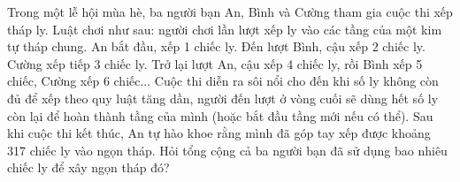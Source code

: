  \begin{ex}%
     Trong một lễ hội mùa hè, ba người bạn An, Bình và Cường tham gia cuộc thi xếp tháp ly. Luật chơi như sau: người chơi lần lượt xếp ly vào các tầng của một kim tự tháp chung. An bắt đầu, xếp 1 chiếc ly. Đến lượt Bình, cậu xếp 2 chiếc ly. Cường xếp tiếp 3 chiếc ly. Trở lại lượt An, cậu xếp 4 chiếc ly, rồi Bình xếp 5 chiếc, Cường xếp 6 chiếc... Cuộc thi diễn ra sôi nổi cho đến khi số ly không còn đủ để xếp theo quy luật tăng dần, người đến lượt ở vòng cuối sẽ dùng hết số ly còn lại để hoàn thành tầng của mình (hoặc bắt đầu tầng mới nếu có thể). Sau khi cuộc thi kết thúc, An tự hào khoe rằng mình đã góp tay xếp được khoảng 317 chiếc ly vào ngọn tháp. Hỏi tổng cộng cả ba người bạn đã sử dụng bao nhiêu chiếc ly để xây ngọn tháp đó?
 \end{ex}
 
